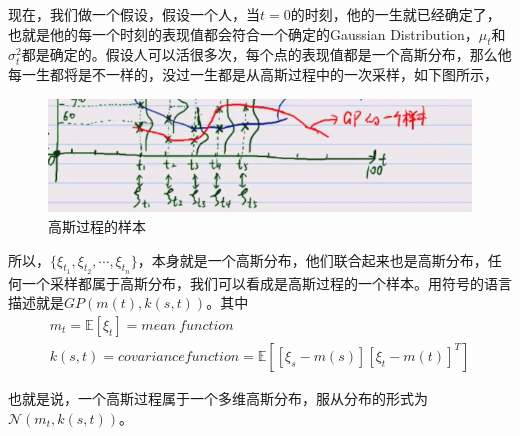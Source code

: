 \documentclass[a4paper]{article}
\begin{document}
现在，我们做一个假设，假设一个人，当$t=0$的时刻，他的一生就已经确定了，也就是他的每一个时刻的表现值都会符合一个确定的Gaussian Distribution，$\mu_t$和$\sigma_t^2$都是确定的。假设人可以活很多次，每个点的表现值都是一个高斯分布，那么他每一生都将是不一样的，没过一生都是从高斯过程中的一次采样，如下图所示，
\begin{figure}[H]
    \centering
    \includegraphics[width=.75\textwidth]{微信图片_20191213130727.png}
    \caption{高斯过程的样本}
    \label{fig:my_label_1}
\end{figure}

所以，$\{\xi_{t_1},\xi_{t_2},\cdots,\xi_{t_n}\}$，本身就是一个高斯分布，他们联合起来也是高斯分布，任何一个采样都属于高斯分布，我们可以看成是高斯过程的一个样本。用符号的语言描述就是$GP(m(t),k(s,t))$。其中
\begin{gather}
    m_t = \mathbb{E}[\xi_t] = mean\ function \\
    k(s,t) = covariance function =\mathbb{E}\left[[\xi_s - m(s)][\xi_t - m(t)]^T\right]
\end{gather}

也就是说，一个高斯过程属于一个多维高斯分布，服从分布的形式为$\mathcal{N}(m_t,k(s,t))$。                                                                                                                                              
\end{document}
